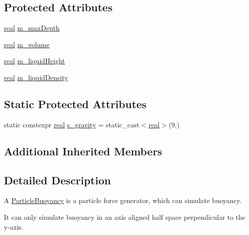 \subsection*{Protected Attributes}
\begin{DoxyCompactItemize}
\item 
\mbox{\hyperlink{namespacer3_ab2016b3e3f743fb735afce242f0dc1eb}{real}} \mbox{\hyperlink{classr3_1_1_particle_buoyancy_a6e79de3d4dc7861fefc3aae9a08aab00}{m\+\_\+max\+Depth}}
\item 
\mbox{\hyperlink{namespacer3_ab2016b3e3f743fb735afce242f0dc1eb}{real}} \mbox{\hyperlink{classr3_1_1_particle_buoyancy_ade7d34f053371dadc2113563760599c9}{m\+\_\+volume}}
\item 
\mbox{\hyperlink{namespacer3_ab2016b3e3f743fb735afce242f0dc1eb}{real}} \mbox{\hyperlink{classr3_1_1_particle_buoyancy_a4fddd40b8ed38a245807f1ff6ebf374e}{m\+\_\+liquid\+Height}}
\item 
\mbox{\hyperlink{namespacer3_ab2016b3e3f743fb735afce242f0dc1eb}{real}} \mbox{\hyperlink{classr3_1_1_particle_buoyancy_a6a62107ee9e97a640371bf3a1aaf92cc}{m\+\_\+liquid\+Density}}
\end{DoxyCompactItemize}
\subsection*{Static Protected Attributes}
\begin{DoxyCompactItemize}
\item 
static constexpr \mbox{\hyperlink{namespacer3_ab2016b3e3f743fb735afce242f0dc1eb}{real}} \mbox{\hyperlink{classr3_1_1_particle_buoyancy_a15857a4724e0e91efd9ce45831d00cbd}{s\+\_\+gravity}} = static\+\_\+cast$<$\mbox{\hyperlink{namespacer3_ab2016b3e3f743fb735afce242f0dc1eb}{real}}$>$(9.)
\end{DoxyCompactItemize}
\subsection*{Additional Inherited Members}


\subsection{Detailed Description}
A \mbox{\hyperlink{classr3_1_1_particle_buoyancy}{Particle\+Buoyancy}} is a particle force generator, which can simulate buoyancy. 

It can only simulate buoyancy in an axis aligned half space perpendicular to the y-\/axis. 

